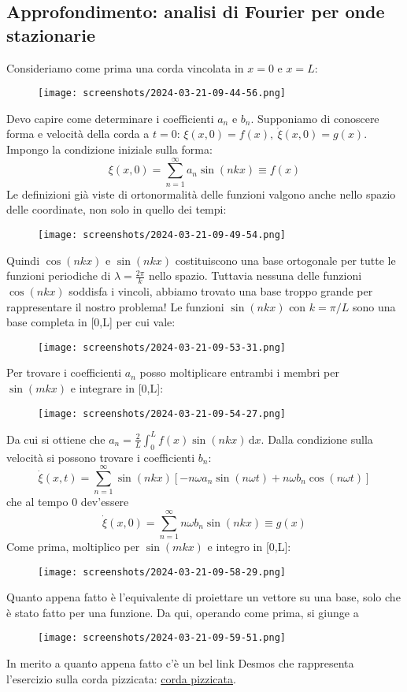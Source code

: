 \subsection{Approfondimento: analisi di Fourier per onde stazionarie}
Consideriamo come prima una corda vincolata in \(x=0\) e \(x=L\):
\begin{figure}[H]
	\centering
	\texttt{[image: screenshots/2024-03-21-09-44-56.png]}
\end{figure}
Devo capire come determinare i coefficienti \(a_n\) e \(b_n\). Supponiamo di conoscere forma e velocità della corda a \(t=0\): \(\xi (x,0) = f(x),\ \dot{\xi }(x,0)=g(x)\). Impongo la condizione iniziale sulla forma:
\[
	\xi (x,0)= \sum_{n=1}^{\infty} a_n \sin (nkx) \equiv f(x)
\]
Le definizioni già viste di ortonormalità delle funzioni valgono anche nello spazio delle coordinate, non solo in quello dei tempi:
\begin{figure}[H]
	\centering
	\texttt{[image: screenshots/2024-03-21-09-49-54.png]}
\end{figure}
Quindi \(\cos (nkx)\) e \(\sin (nkx)\) costituiscono una base ortogonale per tutte le funzioni periodiche di \(\lambda = \frac{2\pi }{k}\) nello spazio. Tuttavia nessuna delle funzioni \(\cos (nkx)\) soddisfa i vincoli, abbiamo trovato una base troppo grande per rappresentare il nostro problema! Le funzioni \(\sin (nkx)\) con \(k=\pi / L\) sono una base completa in [0,L] per cui vale:
\begin{figure}[H]
	\centering
	\texttt{[image: screenshots/2024-03-21-09-53-31.png]}
\end{figure}
Per trovare i coefficienti \(a_n\) posso moltiplicare entrambi i membri per \(\sin (mkx)\) e integrare in [0,L]:
\begin{figure}[H]
	\centering
	\texttt{[image: screenshots/2024-03-21-09-54-27.png]}
\end{figure}
Da cui si ottiene che \(a_n = \frac{2}{L} \int_{0}^{L} f(x) \sin (nkx) \,\mathrm{d}x\). Dalla condizione sulla velocità si possono trovare i coefficienti \(b_n\):
\[
	\dot{\xi }(x,t) = \sum_{n=1}^{\infty} \sin (nkx)[-n \omega a_n \sin (n \omega t) + n \omega b_n \cos (n \omega t)]
\]
che al tempo 0 dev'essere
\[
	\dot{\xi }(x,0) = \sum_{n=1}^{\infty} n \omega b_n \sin (nkx) \equiv  g(x)
\]
Come prima, moltiplico per \(\sin (mkx)\) e integro in [0,L]:
\begin{figure}[H]
	\centering
	\texttt{[image: screenshots/2024-03-21-09-58-29.png]}
\end{figure}
Quanto appena fatto è l'equivalente di proiettare un vettore su una base, solo che è stato fatto per una funzione. Da qui, operando come prima, si giunge a 
\begin{figure}[H]
	\centering
	\texttt{[image: screenshots/2024-03-21-09-59-51.png]}
\end{figure}
In merito a quanto appena fatto c'è un bel link Desmos che rappresenta l'esercizio sulla corda pizzicata: \href{https://www.desmos.com/calculator/wd8dn38ekr}{corda pizzicata}.